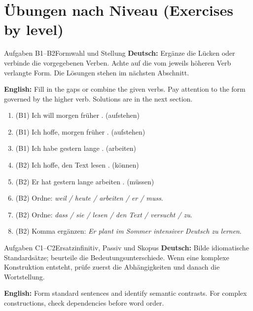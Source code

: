 \documentclass[a4paper,11pt]{article}
\newcommand{\GermanText}[1]{\textbf{Deutsch: }#1\par}
\newcommand{\EnglishText}[1]{{\small\color{SoftGray}\textbf{English: }#1\par}}
\newcommand{\DEEN}[2]{\GermanText{#1}\EnglishText{#2}}
\begin{document}
\section{Übungen nach Niveau \textnormal{(Exercises by level)}}
\begin{grammarentry}{Aufgaben B1--B2}{Formwahl und Stellung}
\DEEN{Ergänze die Lücken oder verbinde die vorgegebenen Verben. Achte auf die vom jeweils höheren Verb verlangte Form. Die Lösungen stehen im nächsten Abschnitt.}{Fill in the gaps or combine the given verbs. Pay attention to the form governed by the higher verb. Solutions are in the next section.}
\end{grammarentry}
\begin{enumerate}[label=\textbf{\arabic*.}]
\item (B1) Ich will morgen früher \underline{\hspace{2.5cm}}. (aufstehen)
\item (B1) Ich hoffe, morgen früher \underline{\hspace{3cm}}. (aufstehen)
\item (B1) Ich habe gestern lange \underline{\hspace{2.6cm}}. (arbeiten)
\item (B2) Ich hoffe, den Text lesen \underline{\hspace{3cm}}. (können)
\item (B2) Er hat gestern lange arbeiten \underline{\hspace{3cm}}. (müssen)
\item (B2) Ordne: \textit{weil / heute / arbeiten / er / muss}.
\item (B2) Ordne: \textit{dass / sie / lesen / den Text / versucht / zu}.
\item (B2) Komma ergänzen: \textit{Er plant im Sommer intensiver Deutsch zu lernen}.
\end{enumerate}
\begin{grammarentry}{Aufgaben C1--C2}{Ersatzinfinitiv, Passiv und Skopus}
\DEEN{Bilde idiomatische Standardsätze; beurteile die Bedeutungsunterschiede. Wenn eine komplexe Konstruktion entsteht, prüfe zuerst die Abhängigkeiten und danach die Wortstellung.}{Form standard sentences and identify semantic contrasts. For complex constructions, check dependencies before word order.}
\end{grammarentry}
\end{document}
